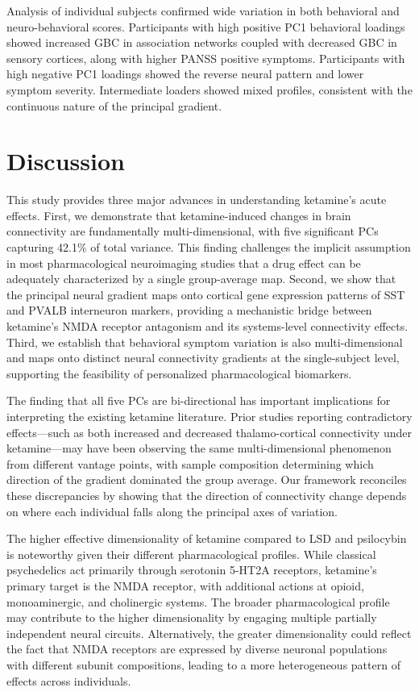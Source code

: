 \documentclass[12pt]{article}
\begin{document}
Analysis of individual subjects confirmed wide variation in both behavioral and neuro-behavioral scores. Participants with high positive PC1 behavioral loadings showed increased GBC in association networks coupled with decreased GBC in sensory cortices, along with higher PANSS positive symptoms. Participants with high negative PC1 loadings showed the reverse neural pattern and lower symptom severity. Intermediate loaders showed mixed profiles, consistent with the continuous nature of the principal gradient.

\section{Discussion}

This study provides three major advances in understanding ketamine's acute effects. First, we demonstrate that ketamine-induced changes in brain connectivity are fundamentally multi-dimensional, with five significant PCs capturing 42.1\% of total variance. This finding challenges the implicit assumption in most pharmacological neuroimaging studies that a drug effect can be adequately characterized by a single group-average map. Second, we show that the principal neural gradient maps onto cortical gene expression patterns of SST and PVALB interneuron markers, providing a mechanistic bridge between ketamine's NMDA receptor antagonism and its systems-level connectivity effects. Third, we establish that behavioral symptom variation is also multi-dimensional and maps onto distinct neural connectivity gradients at the single-subject level, supporting the feasibility of personalized pharmacological biomarkers.

The finding that all five PCs are bi-directional has important implications for interpreting the existing ketamine literature. Prior studies reporting contradictory effects---such as both increased and decreased thalamo-cortical connectivity under ketamine---may have been observing the same multi-dimensional phenomenon from different vantage points, with sample composition determining which direction of the gradient dominated the group average. Our framework reconciles these discrepancies by showing that the direction of connectivity change depends on where each individual falls along the principal axes of variation.

The higher effective dimensionality of ketamine compared to LSD and psilocybin is noteworthy given their different pharmacological profiles. While classical psychedelics act primarily through serotonin 5-HT2A receptors, ketamine's primary target is the NMDA receptor, with additional actions at opioid, monoaminergic, and cholinergic systems. The broader pharmacological profile may contribute to the higher dimensionality by engaging multiple partially independent neural circuits. Alternatively, the greater dimensionality could reflect the fact that NMDA receptors are expressed by diverse neuronal populations with different subunit compositions, leading to a more heterogeneous pattern of effects across individuals.
\end{document}
